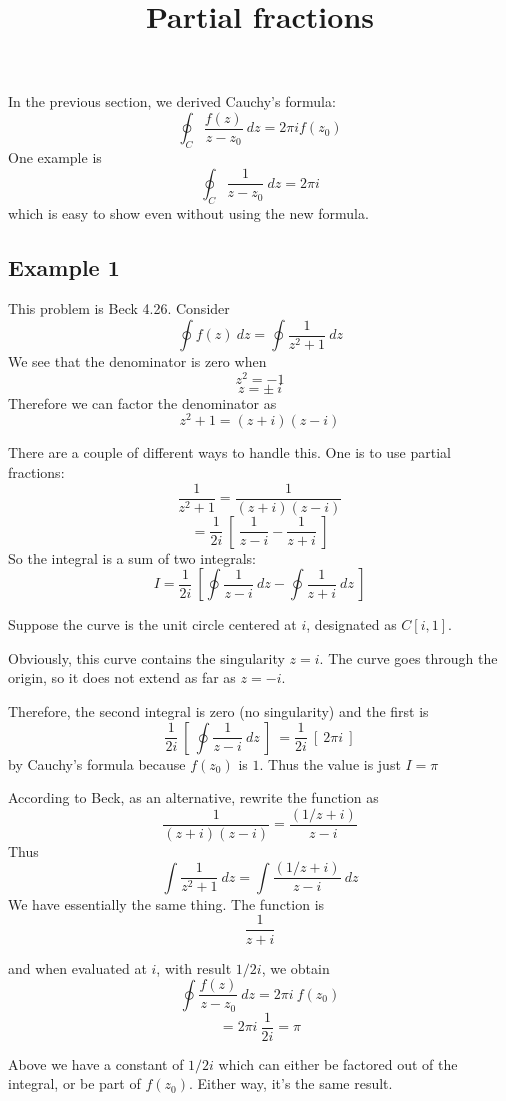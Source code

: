\documentclass[11pt, oneside]{article}
\title{Partial fractions}
\date{}
\begin{document}
\maketitle
\Large


In the previous section, we derived Cauchy's formula:
\[ \oint_C \frac{f(z)}{z-z_0} \ dz = 2 \pi i f(z_0) \]
One example is
\[ \oint_C \frac{1}{z-z_0} \ dz = 2 \pi i \]
which is easy to show even without using the new formula.

\subsection*{Example 1}
This problem is Beck 4.26.  Consider 
\[ \oint f(z) \ dz = \oint \frac{1}{z^2 + 1} \ dz \]
We see that the denominator is zero when
\[ z^2 = -1 \]
\[ z = \pm \ i \]
Therefore we can factor the denominator as
\[ z^2 + 1 = (z + i) (z-i) \]

There are a couple of different ways to handle this.  One is to use partial fractions:
\[ \frac{1}{z^2 + 1} = \frac{1}{(z + i) (z-i)} \]
\[ = \frac{1}{2i} \ [ \ \frac{1}{z - i} - \frac{1}{z+i} \ ] \]
So the integral is a sum of two integrals:
\[ I = \frac{1}{2i} \ [ \oint \frac{1}{z - i}  \ dz -  \oint \frac{1}{z + i} \ dz \ ] \] 

Suppose the curve is the unit circle centered at $i$, designated as $C[i,1]$.  

Obviously, this curve contains the singularity $z = i$.  The curve goes through the origin, so it does not extend as far as $z = -i$.

Therefore, the second integral is zero (no singularity) and the first is
\[ \frac{1}{2i} \ [ \ \oint \frac{1}{z - i}  \ dz \ ] \ = \frac{1}{2i} \ [ \  2 \pi i \ ] \]
by Cauchy's formula because $f(z_0)$ is $1$.  Thus the value is just $I = \pi$

According to Beck, as an alternative, rewrite the function as
\[ \frac{1}{(z + i) (z-i)} = \frac{(1/z+i)}{z-i} \]
Thus
\[ \int \frac{1}{z^2 + 1} \ dz = \int \frac{(1/z+i)}{z-i} \ dz \]
We have essentially the same thing.  The function is
\[ \frac{1}{z+i} \]

and when evaluated at $i$, with result $1/2i$, we obtain
\[ \oint  \frac{f(z)}{z-z_0} \ dz = 2 \pi i \ f(z_0) \]
\[ = 2 \pi i \ \frac{1}{2i} = \pi \]

Above we have a constant of $1/2i$ which can either be factored out of the integral, or be part of $f(z_0)$.  Either way, it's the same result.
\end{document}
